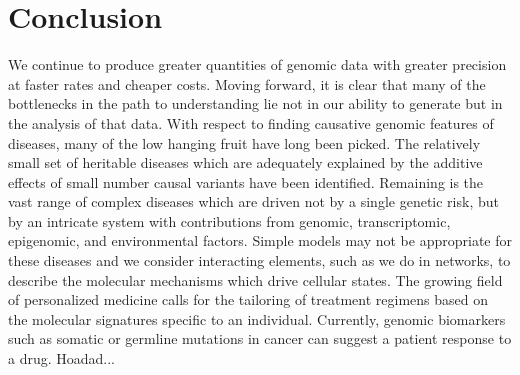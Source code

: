 \chapter{Conclusion}
\label{conclusion}

We continue to produce greater quantities of genomic data with greater precision at faster rates and cheaper costs.  Moving forward, it is clear that many of the bottlenecks in the path to understanding lie not in our ability to generate but in the analysis of that data.  With respect to finding causative genomic features of diseases, many of the low hanging fruit have long been picked.  The relatively small set of heritable diseases which are adequately explained by the additive effects of small number causal variants have been identified.  Remaining is the vast range of complex diseases which are driven not by a single genetic risk, but by an intricate system with contributions from genomic, transcriptomic, epigenomic, and environmental factors.  Simple models may not be appropriate for these diseases and we consider interacting elements, such as we do in networks, to describe the molecular mechanisms which drive cellular states.
The growing field of personalized medicine calls for the tailoring of treatment regimens based on the molecular signatures specific to an individual.  Currently, genomic biomarkers such as somatic or germline mutations in cancer can suggest a patient response to a drug.  Hoadad...